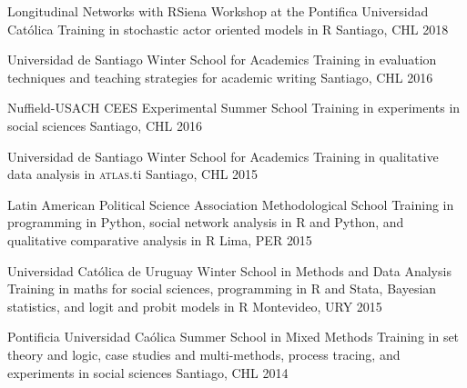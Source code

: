 \vspace{1mm}

\begin{cvhonors}
\cvhonor
{Longitudinal Networks with RSiena Workshop at the Pontifica Universidad Cat\'olica}
{Training in stochastic actor oriented models in R}
{Santiago, CHL}
{2018}
\end{cvhonors}

\vspace{1mm}

\begin{cvhonors}
\cvhonor
{Universidad de Santiago Winter School for Academics}
{Training in evaluation techniques and teaching strategies for academic writing}
{Santiago, CHL}
{2016}
\end{cvhonors}

\vspace{1mm}

\begin{cvhonors}
\cvhonor
{Nuffield-USACH CEES Experimental Summer School}
{Training in experiments in social sciences}
{Santiago, CHL}
{2016}
\end{cvhonors}

\vspace{1mm}

\begin{cvhonors}
\cvhonor
{Universidad de Santiago Winter School for Academics}
{Training in qualitative data analysis in {\scshape atlas}.ti}
{Santiago, CHL}
{2015}
\end{cvhonors}

\vspace{1mm}

\begin{cvhonors}
\cvhonor
{Latin American Political Science Association Methodological School}
{Training in programming in Python, social network analysis in R and Python, and qualitative comparative analysis in R}
{Lima, PER}
{2015}
\end{cvhonors}

\vspace{1mm}

\begin{cvhonors}
\cvhonor
{Universidad Cat\'olica de Uruguay Winter School in Methods and Data Analysis}
{Training in maths for social sciences, programming in R and Stata, Bayesian statistics, and logit and probit models in R}
{Montevideo, URY}
{2015}
\end{cvhonors}

\vspace{1mm}

\begin{cvhonors}
\cvhonor
{Pontificia Universidad Ca\'olica Summer School in Mixed Methods}
{Training in set theory and logic, case studies and multi-methods, process tracing, and experiments in social sciences}
{Santiago, CHL}
{2014}
\end{cvhonors}

\vspace{1mm}
